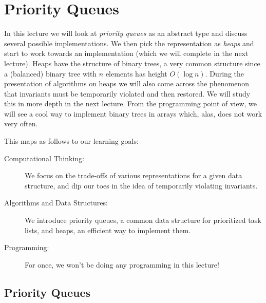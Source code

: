 \chapter{Priority Queues}
\label{ch:pq}

\newcommand{\lecnum}{17}
\newcommand{\lecturer}{Frank Pfenning, Rob Simmons}

\maketitle

\begin{preamble}
\noindent
In this lecture we will look at \emph{priority queues} as an abstract type and
discuss several possible implementations.  We then pick the representation as
\emph{heaps} and start to work towards an implementation (which we will
complete in the next lecture).  Heaps have the structure of binary trees, a
very common structure since a (balanced) binary tree with $n$ elements has
height $O(\log n)$.  During the presentation of algorithms on heaps we will
also come across the phenomenon that invariants must be temporarily violated
and then restored.  We will study this in more depth in the next lecture.
From the programming point of view, we will see a cool way to implement binary
trees in arrays which, alas, does not work very often.
\end{preamble}

\begin{gram}
This maps as follows to our learning goals:
\begin{description}
\item[Computational Thinking: ]%
  We focus on the trade-offs of various representations for a given data
  structure, and dip our toes in the idea of temporarily violating
  invariants.

\item[Algorithms and Data Structures: ]%
  We introduce priority queues, a common data structure for prioritized
  task lists, and heaps, an efficient way to implement them.

\item[Programming: ]%
  For once, we won't be doing any programming in this lecture!
\end{description}
\end{gram}

\section{Priority Queues}
\label{sec:pq:intro}

